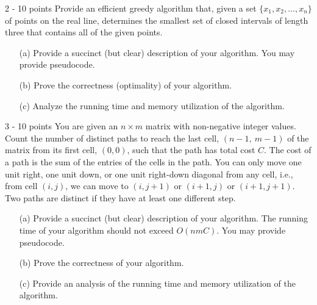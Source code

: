 \documentclass{common/cs157}
\begin{document}
\begin{problem}{2 - 10 points}
Provide an efficient greedy algorithm that, given a set $\{x_1,x_2,\ldots,x_n\}$ of points on the real line, determines the smallest set of  closed intervals of length three that contains all of the given points.
\begin{enumerate}
    \item[(a)] Provide a succinct (but clear) description of your algorithm. You may provide pseudocode.
    \item[(b)] Prove the correctness (optimality) of your algorithm.
    \item[(c)] Analyze the running time and memory utilization of the algorithm.
\end{enumerate}
\end{problem}
\newpage
\begin{problem}{3 - 10 points}
You are given an $n \times m$ matrix with non-negative integer values. Count the number of distinct paths to reach the last cell, $(n - 1,\ m - 1)$ of the matrix from its first cell, $(0, 0)$, such that the path has total cost $C$. The cost of a path is the sum of the entries of the cells in the path. You can only move one unit right, one unit down, or one unit right-down diagonal from any cell, i.e., from cell $(i, j)$, we can move to $(i, j+1)$ or $(i+1, j)$ or $(i+1,j+1)$. Two paths are distinct if they have at least one different step.
\begin{enumerate}
    \item[(a)] Provide a succinct (but clear) description of your algorithm. The running time of your algorithm should not exceed $O(nmC)$. You may provide pseudocode.
    \item[(b)] Prove the correctness of your algorithm.
    \item[(c)] Provide an analysis of the running time and memory utilization of the algorithm.
\end{enumerate}
\end{problem}
\newpage
\end{document}
